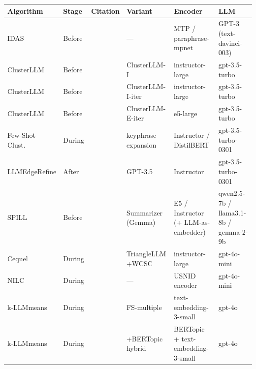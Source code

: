 \documentclass[11pt,a4paper,oneside]{report}
\begin{document}
\begin{table}[!htbp]
\centering
\footnotesize
\setlength{\tabcolsep}{4pt}
\renewcommand{\arraystretch}{1.15}
\begin{tabularx}{\textwidth}{@{}l l >{\raggedright\arraybackslash}p{2.7cm} >{\raggedright\arraybackslash}p{2.4cm} >{\raggedright\arraybackslash}X >{\raggedright\arraybackslash}X@{}}
\toprule
\textbf{Algorithm} & \textbf{Stage} & \textbf{Citation} & \textbf{Variant} & \textbf{Encoder} & \textbf{LLM} \\
\midrule
IDAS                & Before     & \citet{deraedt2023idas}            & ---                      & MTP / paraphrase-mpnet                  & GPT-3 (text-davinci-003) \\
ClusterLLM          & Before     & \citet{zhang2023clusterllm}        & ClusterLLM-I             & instructor-large                   & gpt-3.5-turbo \\
ClusterLLM          & Before     & \citet{zhang2023clusterllm}        & ClusterLLM-I-iter        & instructor-large                   & gpt-3.5-turbo \\
ClusterLLM          & Before     & \citet{zhang2023clusterllm}        & ClusterLLM-E-iter        & e5-large                           & gpt-3.5-turbo \\
Few-Shot Clust.\    & During     & \citet{viswanathan2024fewshot}     & keyphrase expansion      & Instructor / DistilBERT            & gpt-3.5-turbo-0301 \\
LLMEdgeRefine       & After      & \citet{feng2024llmedgerefine}      & GPT-3.5                  & Instructor                         & gpt-3.5-turbo-0301 \\
SPILL               & Before     & \citet{lin2025spill}               & Summarizer (Gemma)       & E5 / Instructor (+ LLM-as-embedder) & qwen2.5-7b / llama3.1-8b / gemma-2-9b \\
Cequel              & During     & \citet{wang2025cequel}             & TriangleLLM +WCSC        & instructor-large                   & gpt-4o-mini \\
NILC                & During     & \citet{wang2025nilc}               & ---                      & USNID encoder                      & gpt-4o-mini \\
k-LLMmeans          & During     & \citet{diazrodriguez2026kllmmeans} & FS-multiple              & text-embedding-3-small             & gpt-4o \\
k-LLMmeans          & During     & \citet{diazrodriguez2026kllmmeans} & +BERTopic hybrid         & BERTopic + text-embedding-3-small  & gpt-4o \\

\end{tabularx}
\end{table}
\end{document}
